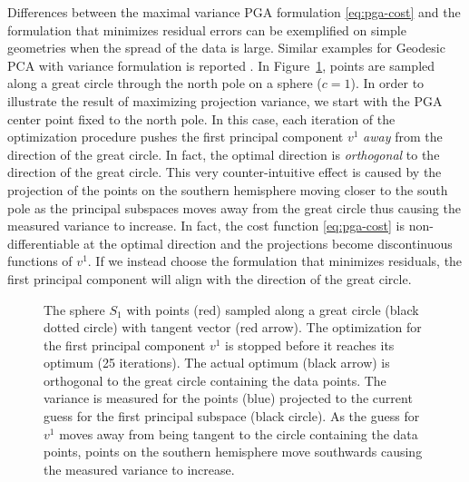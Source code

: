 \documentclass[final]{svjour3}
\begin{document}
Differences between the maximal variance PGA formulation
\eqref{eq:pga-cost} and the formulation that minimizes residual errors can be
exemplified on simple geometries when the spread of the data is large.
Similar examples for Geodesic PCA with variance formulation is reported \cite{huckemann_intrinsic_2010}.
In Figure~\ref{fig:sphere-orth}, points are sampled along a great circle through
the north pole on a sphere ($c=1$). In order to illustrate the result of
maximizing projection variance, we start with the PGA center point fixed to
the north pole. In this case, each iteration of the optimization procedure
pushes the first principal component $v^1$ \emph{away} from the direction of the great
circle. In fact, the optimal direction is \emph{orthogonal} to the direction of
the great circle. This very counter-intuitive effect is caused by the projection of the
points on the southern hemisphere moving closer to the south pole as the principal
subspaces moves away from the great circle thus causing the measured variance to
increase. In fact, the cost function \eqref{eq:pga-cost}
is non-differentiable at the optimal direction and the projections become
discontinuous functions of $v^1$. If we instead choose the formulation that
minimizes residuals, the first principal component will align with the direction
of the great circle.
\begin{figure}[h]
    \begin{center}
    \end{center}
    \caption{The sphere $S_1$ with points (red) sampled along a great circle
    (black dotted circle) with tangent vector (red arrow). The optimization for the first principal 
    component $v^1$ is stopped before it reaches its optimum (25
    iterations). The actual optimum (black arrow) is orthogonal to the
    great circle containing the data points. The variance is measured for the points (blue) projected to
    the current guess for the first principal subspace (black circle). 
    As the guess for $v^1$ moves away from being tangent to the circle containing the data points,
    points on
    the southern hemisphere move southwards 
    causing the measured variance to increase.
}
    \label{fig:sphere-orth}
\end{figure}
\end{document}
